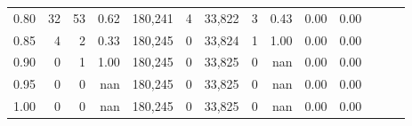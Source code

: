 \begin{tabular}{rrrrrrrrrrrrrr}
0.80 &      32 &     53 &  0.62 &  180,241 &        4 &  33,822 &       3 &  0.43 &  0.00 &      0.00 \\
0.85 &       4 &      2 &  0.33 &  180,245 &        0 &  33,824 &       1 &  1.00 &  0.00 &      0.00 \\
0.90 &       0 &      1 &  1.00 &  180,245 &        0 &  33,825 &       0 &   nan &  0.00 &      0.00 \\
0.95 &       0 &      0 &   nan &  180,245 &        0 &  33,825 &       0 &   nan &  0.00 &      0.00 \\
1.00 &       0 &      0 &   nan &  180,245 &        0 &  33,825 &       0 &   nan &  0.00 &      0.00 \\
\bottomrule
\end{tabular}
